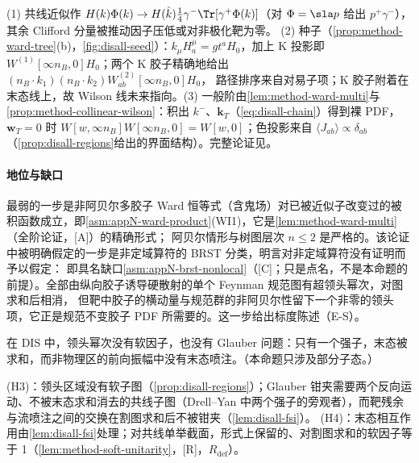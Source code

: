 \begin{proofsketch}
(1) 共线近似作 $H(k)\Phi(k)\to H(\hat k)\frac14\gamma^-\Tr[\gamma^+\Phi(k)]$（对 $\Phi=\sla p$ 给出 $p^+\gamma^-$），其余 Clifford 分量被推动因子压低或对非极化靶为零。
(2) 种子（\cref{prop:method-ward-tree}(b)，\cref{fig:disall-seed}）：$k_\mu H^\mu_a=gt^aH_0$，加上 K 投影即 $W^{(1)}[\infty n_B,0]H_0$；两个 K 胶子精确地给出 $(n_B\cdot k_1)(n_B\cdot k_2)W^{(2)}_{ab}[\infty n_B,0]H_0$，
路径排序来自对易子项；K 胶子附着在末态线上，故 Wilson 线未来指向。(3) 一般阶由\cref{lem:method-ward-multi}与\cref{prop:method-collinear-wilson}：积出 $k^-$、$\mathbf k_T$（\cref{eq:disall-chain}）得到裸 PDF，
$\mathbf w_T=0$ 时 $W[w,\infty n_B]W[\infty n_B,0]=W[w,0]$；色投影来自 $\langle J_{ab}\rangle\propto\delta_{ab}$（\cref{prop:disall-regions}给出的界面结构）。完整论证见\cite[第~11.3~节]{Collins2011}。
\end{proofsketch}

\paragraph{地位与缺口}
最弱的一步是非阿贝尔多胶子 Ward 恒等式（含鬼场）对已被近似子改变过的被积函数成立，即\cref{asm:appN-ward-product}(WI1)，它是\cref{lem:method-ward-multi}（全阶论证，[A]）的精确形式；
阿贝尔情形与树图层次 $n\le2$ 是严格的。该论证中被明确假定的一步是非定域算符的 BRST 分类，\cite[第~11.3.2~节，第~407--410~页]{Collins2011}明言对非定域算符没有证明而予以假定：
即具名缺口\cref{asm:appN-brst-nonlocal}（[C]；只是点名，不是本命题的前提）。全部由纵向胶子诱导硬散射的单个 Feynman 规范图有超领头幂次，对图求和后相消，
但靶中胶子的横动量与规范群的非阿贝尔性留下一个非零的领头项，它正是规范不变胶子 PDF 所需要的\cite{Collins:2008sg}。这一步给出标度陈述（E-S）。

\begin{proposition}\label{prop:disall-h3h4}
在 DIS 中，领头幂次没有软因子，也没有 Glauber 问题：只有一个强子，末态被求和，而非物理区的前向振幅中没有末态喷注。（本命题只涉及部分子态。）
\end{proposition}

\begin{proofsketch}
(H3)：领头区域没有软子图（\cref{prop:disall-regions}）；Glauber 钳夹需要两个反向运动、不被末态求和消去的共线子图（Drell--Yan 中两个强子的旁观者），而靶残余与流喷注之间的交换在割图求和后不被钳夹（\cref{lem:disall-fsi}）。
(H4)：末态相互作用由\cref{lem:disall-fsi}处理；对共线单举截面，形式上保留的、对割图求和的软因子等于 1（\cref{lem:method-soft-unitarity}，[R]，$R_{\mathrm{def}}$）。
\end{proofsketch}

